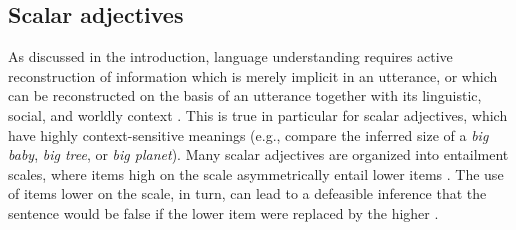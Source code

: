 \documentclass[10pt]{article}
\begin{document}
\vspace{-0.5em}


\subsection{\label{scalar-theory}Scalar adjectives}
\vspace{-.15mm}
As discussed in the introduction, language understanding requires active reconstruction of information which is merely implicit in an utterance, or which can be reconstructed on the basis of an utterance together with its linguistic, social, and worldly context \cite{grice1975logic,hobbs1993interpretation,clark1996using,hanna2003effects,piantadosi2012communicative}.
%
%
%
This is true in particular for scalar adjectives, which have highly context-sensitive meanings (e.g., compare the inferred size of a \emph{big baby}, \emph{big tree}, or \emph{big planet}). Many scalar adjectives are organized into entailment scales, where items high on the scale asymmetrically entail lower items \cite{horn89,horn2000pick}. The use of items lower on the scale, in turn, can lead to a defeasible inference that the sentence would be false if the lower item were replaced by the higher \cite{grice1975logic,horn89,lassiter10a}.
 \vspace{-.05in} 
\end{document}
